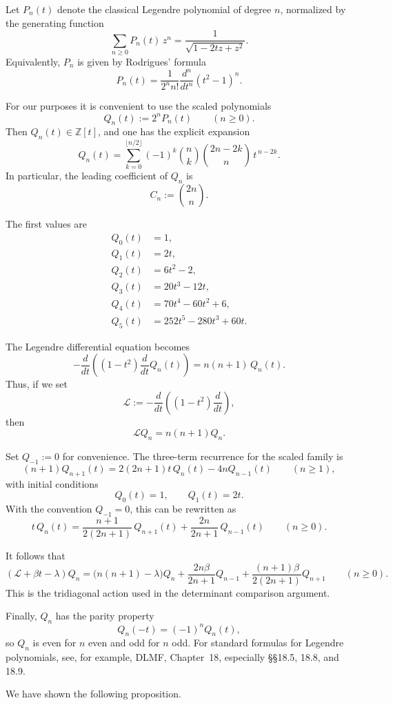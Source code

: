\documentclass[11pt,letterpaper]{amsart}
\numberwithin{equation}{section}
\theoremstyle{plain}
\theoremstyle{remark}
\begin{document}
Let \(P_n(t)\) denote the classical Legendre polynomial of degree \(n\), normalized by the generating function
\[
\sum_{n\ge 0} P_n(t)\,z^n=\frac{1}{\sqrt{1-2tz+z^2}}.
\]
Equivalently, \(P_n\) is given by Rodrigues' formula
\[
P_n(t)=\frac{1}{2^n n!}\frac{d^n}{dt^n}(t^2-1)^n.
\]

For our purposes it is convenient to use the scaled polynomials
\[
Q_n(t):=2^nP_n(t)\qquad(n\ge 0).
\]
Then \(Q_n(t)\in \mathbb Z[t]\), and one has the explicit expansion
\[
Q_n(t)
=
\sum_{k=0}^{\lfloor n/2\rfloor}
(-1)^k
\binom{n}{k}
\binom{2n-2k}{n}
\,t^{\,n-2k}.
\]
In particular, the leading coefficient of \(Q_n\) is
\[
C_n:=\binom{2n}{n}.
\]

The first values are
\begin{align*}
Q_0(t)&=1,\\
Q_1(t)&=2t,\\
Q_2(t)&=6t^2-2,\\
Q_3(t)&=20t^3-12t,\\
Q_4(t)&=70t^4-60t^2+6,\\
Q_5(t)&=252t^5-280t^3+60t.
\end{align*}

The Legendre differential equation becomes
\[
-\frac{d}{dt}\!\left((1-t^2)\frac{d}{dt}Q_n(t)\right)=n(n+1)\,Q_n(t).
\]
Thus, if we set
\[
\mathcal L:=-\frac{d}{dt}\!\left((1-t^2)\frac{d}{dt}\right),
\]
then
\[
\mathcal L Q_n=n(n+1)Q_n.
\]

Set \(Q_{-1}:=0\) for convenience. The three-term recurrence for the scaled family is
\[
(n+1)Q_{n+1}(t)=2(2n+1)t\,Q_n(t)-4nQ_{n-1}(t)
\qquad(n\ge 1),
\]
with initial conditions
\[
Q_0(t)=1,\qquad Q_1(t)=2t.
\]
With the convention \(Q_{-1}=0\), this can be rewritten as
\[
t\,Q_n(t)
=
\frac{n+1}{2(2n+1)}\,Q_{n+1}(t)
+
\frac{2n}{2n+1}\,Q_{n-1}(t)
\qquad(n\ge 0).
\]

It follows that
\[
(\mathcal L+\beta t-\lambda)Q_n
=
\bigl(n(n+1)-\lambda\bigr)Q_n
+
\frac{2n\beta}{2n+1}Q_{n-1}
+
\frac{(n+1)\beta}{2(2n+1)}Q_{n+1}
\qquad(n\ge 0).
\]
This is the tridiagonal action used in the determinant comparison argument.

Finally, \(Q_n\) has the parity property
\[
Q_n(-t)=(-1)^nQ_n(t),
\]
so \(Q_n\) is even for \(n\) even and odd for \(n\) odd. For standard formulas for Legendre polynomials, see, for example, DLMF, Chapter~18, especially \S\S18.5, 18.8, and 18.9.

We have shown the following proposition.
\end{document}
